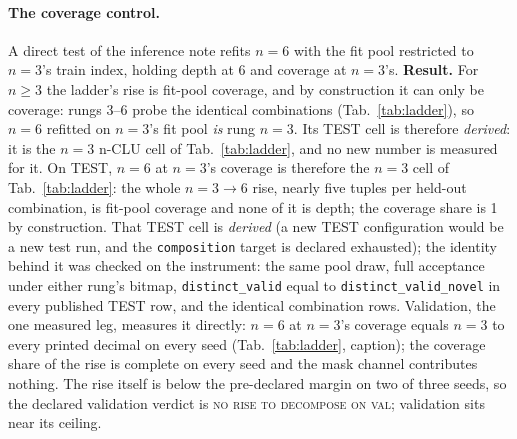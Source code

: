 \documentclass{article} %
\begin{document}
\paragraph{The coverage control.} A direct test of the inference note refits $n=6$ with the
fit pool restricted to $n=3$'s train index, holding depth at 6 and coverage at $n=3$'s.
\textbf{Result.} For $n\ge3$ the ladder's rise is fit-pool
coverage, and by construction it can only be coverage: rungs 3--6 probe the identical combinations (Tab.~\ref{tab:ladder}), %
so $n=6$ refitted on $n=3$'s fit pool \emph{is} rung $n=3$. Its TEST cell is therefore
\emph{derived}: it is the $n=3$ n-CLU cell of Tab.~\ref{tab:ladder}, and no new
number is measured for it. %
On TEST, $n=6$ at $n=3$'s coverage is therefore the $n=3$ cell of Tab.~\ref{tab:ladder}: %
the whole $n=3\to6$ rise, nearly five tuples per held-out combination, is fit-pool coverage and %
none of it is depth; the coverage share is 1 by construction. That TEST cell is \emph{derived} (a new TEST configuration would be a new test run, and the \texttt{composition} target is
declared exhausted); the identity behind it was checked on the instrument: the same pool draw,
full acceptance under either rung's bitmap, \texttt{distinct\_valid} equal to %
\texttt{distinct\_valid\_novel} in every published TEST row, and the identical %
combination rows. Validation, the one measured leg, measures it %
directly: $n=6$ at $n=3$'s coverage equals $n=3$ to every printed decimal on every seed %
(Tab.~\ref{tab:ladder}, caption); the coverage %
share of the rise is complete on every seed and the mask channel contributes nothing. The rise itself %
is below the pre-declared margin on two of three seeds, so the %
declared validation verdict is \textsc{no rise to decompose on val}; validation sits near its ceiling. %
\end{document}
